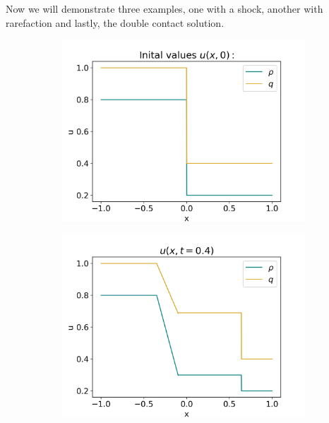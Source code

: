 \documentclass[10pt]{article}
\numberwithin{equation}{section}
\begin{document}
Now we will demonstrate three examples, one with a shock, another with rarefaction and lastly, the double contact solution.
\begin{figure}
     \centering
     \begin{subfigure}[t]{0.35\textwidth}
         \centering
         \includegraphics[width=\textwidth]{Figures/Model/Plots/SysRarefacIV.png}
     \end{subfigure}
     \begin{subfigure}[t]{0.35\textwidth}
         \centering
         \includegraphics[width=\textwidth]{Figures/Model/Plots/SysRarefacAtTime.png}
     \end{subfigure}
     \hfill
     \begin{subfigure}[b]{0.35\textwidth}

\end{subfigure}
\end{figure}
\end{document}
